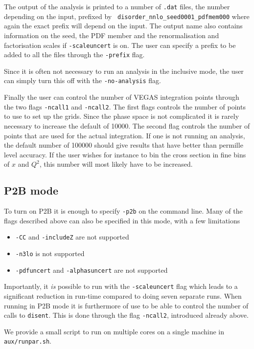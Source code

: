 \documentclass[submission, PhysCodeb]{SciPost}
\newcommand{\disent}{{\tt disent}}
\begin{document}
The output of the analysis is printed to a number of {\tt .dat} files,
the number depending on the input, prefixed by {\tt
  disorder\_nnlo\_seed0001\_pdfmem000} where again the exact prefix
will depend on the input. The output name also contains information on
the seed, the PDF member and the renormalisation and factorisation
scales if {\tt -scaleuncert} is on. The user can specify a prefix to
be added to all the files through the {\tt -prefix} flag.

Since it is often not necessary to run an analysis in the inclusive
mode, the user can simply turn this off with the {\tt -no-analysis}
flag.

Finally the user can control the number of VEGAS integration points
through the two flags {\tt -ncall1} and {\tt -ncall2}. The first flags
controls the number of points to use to set up the grids. Since the
phase space is not complicated it is rarely necessary to increase the
default of 10000. The second flag controls the number of points that
are used for the actual integration. If one is not running an
analysis, the default number of 100000 should give results that have
better than permille level accuracy. If the user wishes for instance
to bin the cross section in fine bins of $x$ and $Q^2$, this number
will most likely have to be increased.

\subsection{P2B mode}
\label{sec:P2Bmode}
To turn on P2B it is enough to specify {\tt -p2b} on the command
line. Many of the flags described above can also be specified in this
mode, with a few limitations
\begin{itemize}
\item {\tt -CC} and {\tt -includeZ} are not supported
\item {\tt -n3lo} is not supported
\item {\tt -pdfuncert} and {\tt -alphasuncert} are not supported
\end{itemize}
Importantly, it \emph{is} possible to run with the {\tt -scaleuncert}
flag which leads to a significant reduction in run-time compared to
doing seven separate runs. When running in P2B mode it is furthermore of
use to be able to control the number of calls to \disent{}. This is
done through the flag {\tt -ncall2}, introduced already above. 

We provide a small script to run on multiple cores on a single machine
in {\tt aux/runpar.sh}. 
\end{document}
